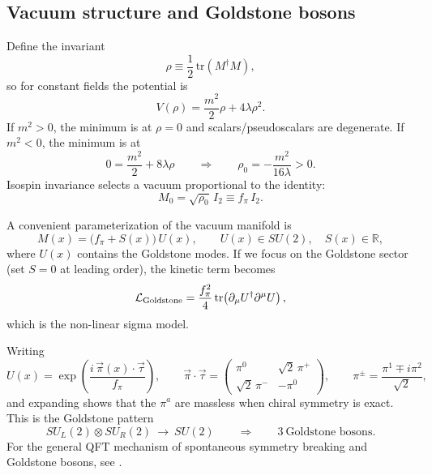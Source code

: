 \subsection{Vacuum structure and Goldstone bosons}

Define the invariant
\begin{equation}
\rho \equiv \frac12\,\mathrm{tr}(M^\dagger M),
\end{equation}
so for constant fields the potential is
\begin{equation}
V(\rho) = \frac{m^2}{2}\rho + 4\lambda \rho^2.
\end{equation}
If $m^2>0$, the minimum is at $\rho=0$ and scalars/pseudoscalars are degenerate.
If $m^2<0$, the minimum is at
\begin{equation}
0=\frac{m^2}{2}+8\lambda\rho
\qquad\Rightarrow\qquad
\rho_0 = -\frac{m^2}{16\lambda} > 0.
\end{equation}
Isospin invariance selects a vacuum proportional to the identity:
\begin{equation}
M_0=\sqrt{\rho_0}\,I_2 \equiv f_\pi\,I_2.
\label{eq:vev_fpi}
\end{equation}

A convenient parameterization of the vacuum manifold is
\begin{equation}
M(x)=\bigl(f_\pi + S(x)\bigr)\,U(x),
\qquad U(x)\in SU(2),\quad S(x)\in\mathbb{R},
\label{eq:polar_decomp}
\end{equation}
where $U(x)$ contains the Goldstone modes.
If we focus on the Goldstone sector (set $S=0$ at leading order),
the kinetic term becomes
\begin{equation}
\mathcal{L}_{\rm Goldstone}
=\frac{f_\pi^2}{4}\,\mathrm{tr}\!\left(\partial_\mu U^\dagger\partial^\mu U\right),
\label{eq:nonlinear_sigma_kin}
\end{equation}
which is the non-linear sigma model.

Writing
\begin{equation}
U(x)=\exp\!\left(\frac{i\,\vec\pi(x)\cdot\vec\tau}{f_\pi}\right),
\qquad
\vec\pi\cdot\vec\tau=
\begin{pmatrix}
\pi^0 & \sqrt2\,\pi^+ \\
\sqrt2\,\pi^- & -\pi^0
\end{pmatrix},
\qquad
\pi^\pm=\frac{\pi^1\mp i\pi^2}{\sqrt2},
\end{equation}
and expanding shows that the $\pi^a$ are massless when chiral symmetry is exact.
This is the Goldstone pattern
\begin{equation}
SU_L(2)\otimes SU_R(2)\ \longrightarrow\ SU(2)
\qquad\Rightarrow\qquad
3\ \text{Goldstone bosons}.
\end{equation}
For the general QFT mechanism of spontaneous symmetry breaking and Goldstone bosons,
see \citep{peskin1995,schwartz2014,weinberg1995qtf1}.

